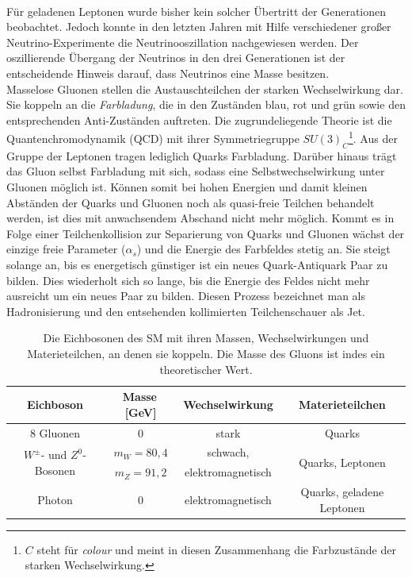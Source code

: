 \\
F\"ur geladenen Leptonen wurde bisher kein solcher \"Ubertritt der Generationen beobachtet. Jedoch konnte in den letzten Jahren mit Hilfe verschiedener gro\ss{}er Neutrino-Experimente die Neutrinooszillation nachgewiesen werden. Der oszillierende \"Ubergang der Neutrinos in den drei Generationen ist der entscheidende Hinweis darauf, dass Neutrinos eine Masse besitzen.  
\\
Masselose Gluonen stellen die Austauschteilchen der starken Wechselwirkung dar. Sie koppeln an die \textit{Farbladung}, die in den Zust\"anden blau, rot und gr\"un sowie den entsprechenden Anti-Zust\"anden auftreten. Die zugrundeliegende Theorie ist die Quantenchromodynamik (QCD) mit ihrer Symmetriegruppe $SU(3)_{C}$\footnote{$C$ steht f\"ur \textit{colour} und meint in diesen Zusammenhang die Farbzust\"ande der starken Wechselwirkung.}. Aus der Gruppe der Leptonen tragen lediglich Quarks Farbladung. Dar\"uber hinaus tr\"agt das Gluon selbst Farbladung mit sich, sodass eine Selbstwechselwirkung unter Gluonen m\"oglich ist. Können somit bei hohen Energien und damit kleinen Abst\"anden der Quarks und Gluonen noch als quasi-freie Teilchen behandelt werden, ist dies mit anwachsendem Abschand nicht mehr möglich. Kommt es in Folge einer Teilchenkollision zur Separierung von Quarks und Gluonen wächst der einzige freie Parameter ($\alpha_{s}$) und die Energie des Farbfeldes stetig an. Sie steigt solange an, bis es energetisch g\"unstiger ist ein neues Quark-Antiquark Paar zu bilden. Dies wiederholt sich so lange, bis die Energie des Feldes nicht mehr ausreicht um ein neues Paar zu bilden. Diesen Prozess bezeichnet man als Hadronisierung und den entsehenden kollimierten Teilchenschauer als Jet. 
\\
\begin{table}[tp]
\centering
\begin{tabular}{c||c|c|c}
Eichboson & Masse\,[GeV] & Wechselwirkung & Materieteilchen \\ \hline\hline
8 Gluonen & 0 & stark & Quarks \\ \hline
\multirow{2}{*}{$W^{\pm}$- und $Z^{0}$-Bosonen} & $m_{W}=80,4$ & schwach, & \multirow{2}{*}{Quarks, Leptonen} \\
 & $m_{Z}=91,2$ & elektromagnetisch & \\ \hline
Photon & 0 & elektromagnetisch & Quarks, geladene Leptonen\\ \hline
\end{tabular}
	  	\caption{Die Eichbosonen des SM mit ihren Massen, Wechselwirkungen und Materie\-teilchen, an denen sie koppeln. Die Masse des Gluons ist indes ein theo\-re\-tischer Wert.}
	  		\label{Eichbosonen}
\end{table}


